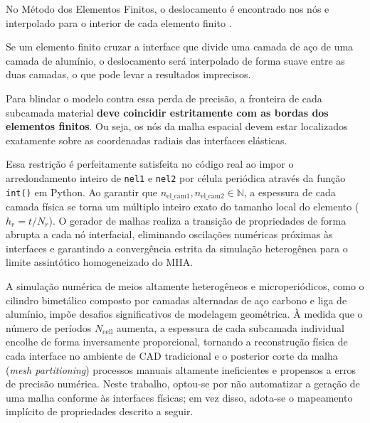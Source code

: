 
No Método dos Elementos Finitos, o deslocamento é encontrado nos nós e interpolado para o interior de cada elemento finito \cite{logg2012automated}.

Se um elemento finito cruzar a interface que divide uma camada de aço de uma camada de alumínio, o deslocamento será interpolado de forma suave entre as duas camadas, o que pode levar a resultados imprecisos.

Para blindar o modelo contra essa perda de precisão, a fronteira de cada subcamada material \textbf{deve coincidir estritamente com as bordas dos elementos finitos}. Ou seja, os nós da malha espacial devem estar localizados exatamente sobre as coordenadas radiais das interfaces elásticas.

Essa restrição é perfeitamente satisfeita no código real ao impor o arredondamento inteiro de \texttt{nel1} e \texttt{nel2} por célula periódica através da função \texttt{int()} em Python. Ao garantir que $n_{\text{el\_cam1}}, n_{\text{el\_cam2}} \in \mathbb{N}$, a espessura de cada camada física se torna um múltiplo inteiro exato do tamanho local do elemento ($h_r = t / N_r$). O gerador de malhas realiza a transição de propriedades de forma abrupta a cada nó interfacial, eliminando oscilações numéricas próximas às interfaces e garantindo a convergência estrita da simulação heterogênea para o limite assintótico homogeneizado do MHA.

A simulação numérica de meios altamente heterogêneos e microperiódicos, como o cilindro bimetálico composto por camadas alternadas de aço carbono e liga de alumínio, impõe desafios significativos de modelagem geométrica. À medida que o número de períodos $N_{\text{cell}}$ aumenta, a espessura de cada subcamada individual encolhe de forma inversamente proporcional, tornando a reconstrução física de cada interface no ambiente de CAD tradicional e o posterior corte da malha (\textit{mesh partitioning}) processos manuais altamente ineficientes e propensos a erros de precisão numérica. Neste trabalho, optou-se por não automatizar a geração de uma malha conforme às interfaces físicas; em vez disso, adota-se o mapeamento implícito de propriedades descrito a seguir.

